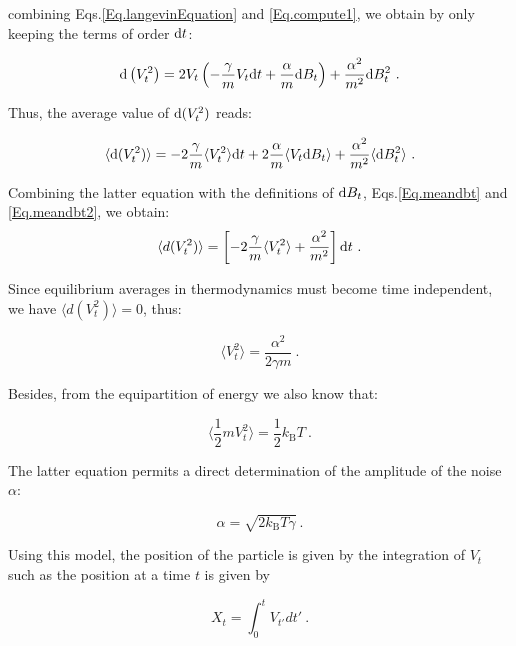 combining Eqs.\ref{Eq.langevinEquation} and \ref{Eq.compute1}, we obtain by only keeping  the terms of order $\textnormal{d}t$:

\begin{equation}
	\textnormal{d}\left(V_t^2\right) = 2V_t\left( -\frac{\gamma}{m}V_t\textnormal{d}t + \frac{\alpha}{m}\textnormal{d}B_t  \right) + \frac{\alpha^2}{m^2}\textnormal{d}B_t ^2 ~. 
\end{equation}

Thus, the average value of $ \textnormal{d}(V_t ^2)$ reads:

\begin{equation}
	\langle \textnormal{d}(V_t ^2)\rangle = -2 \frac{\gamma}{m} \langle V_t ^2 \rangle \textnormal dt + 2 \frac{\alpha}{m} \langle V_t \textnormal{d}B_t \rangle + \frac{\alpha^2}{m^2} \langle \textnormal{d}B_t ^2 \rangle~.
\end{equation} 

Combining the latter equation with the definitions of $\textnormal{d}B_t$, Eqs.\ref{Eq.meandbt} and \ref{Eq.meandbt2}, we obtain:
\begin{equation}
	\langle d(V_t^2) \rangle = \left[-2 \frac{\gamma}{m} \langle V_t ^2 \rangle + \frac{\alpha^2}{m^2}\right]\textnormal{d}t~.
\end{equation}

Since equilibrium averages in thermodynamics must become time independent, we have $\langle d(V_t^2) \rangle = 0$, thus:

\begin{equation}
	\langle V_t ^2\rangle = \frac{\alpha ^2}{2 \gamma m}~. 
\end{equation}

Besides, from the equipartition of energy we also know that:

\begin{equation}
	\langle \frac{1}{2} m V_t ^2 \rangle  = \frac{1}{2} k_\mathrm{B} T~.
\end{equation}

The latter equation permits a direct determination of the amplitude of the noise $\alpha$: 

\begin{equation}
	\alpha = \sqrt{2k_\mathrm{B}T \gamma}~.
\end{equation}

Using this model, the position of the particle is given by the integration of $V_t$ such as the position at a time $t$ is given by

\begin{equation}
	X_t = \int _0 ^t V_{t'}dt'~.
	\label{Eq:particle_position}
\end{equation}


